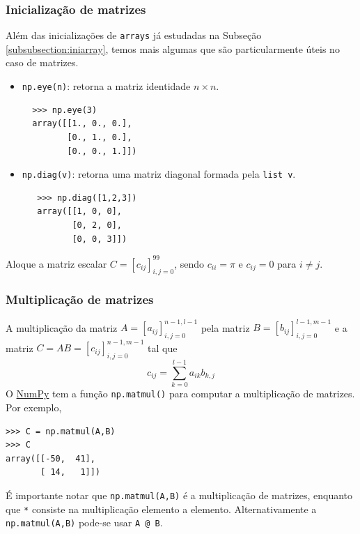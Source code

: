 \documentclass[12pt]{article}
\begin{document}
\subsubsection{Inicialização de matrizes}

Além das inicializações de \lstinline+arrays+ já estudadas na Subseção \ref{subsubsection:iniarray}, temos mais algumas que são particularmente úteis no caso de matrizes.
\begin{itemize}
\item \lstinline+np.eye(n)+: retorna a matriz identidade $n\times n$.
  \begin{lstlisting}
  >>> np.eye(3)
  array([[1., 0., 0.],
         [0., 1., 0.],
         [0., 0., 1.]])
   \end{lstlisting}
 \item \lstinline+np.diag(v)+: retorna uma matriz diagonal formada pela \lstinline+list v+.
   \begin{lstlisting}
   >>> np.diag([1,2,3])
   array([[1, 0, 0],
          [0, 2, 0],
          [0, 0, 3]])
   \end{lstlisting}
 \end{itemize}

 \begin{exr}
   Aloque a matriz escalar $C = [c_{ij}]_{i,j=0}^{99}$, sendo $c_{ii}=\pi$ e $c_{ij}=0$ para $i\neq j$.
 \end{exr}

\subsubsection{Multiplicação de matrizes}

A multiplicação da matriz $A = [a_{ij}]_{i,j=0}^{n-1,l-1}$ pela matriz $B = [b_{ij}]_{i,j=0}^{l-1,m-1}$ e a matriz $C = AB = [c_{ij}]_{i,j=0}^{n-1,m-1}$ tal que
\begin{equation}
  c_{ij} = \sum_{k=0}^{l-1} a_{ik}b_{k,j}
\end{equation}
O \href{https://numpy.org/}{NumPy} tem a função \lstinline+np.matmul()+ para computar a multiplicação de matrizes. Por exemplo,
\begin{lstlisting}
>>> C = np.matmul(A,B)
>>> C
array([[-50,  41],
       [ 14,   1]])
\end{lstlisting}

\begin{obs}
  É importante notar que \lstinline+np.matmul(A,B)+ é a multiplicação de matrizes, enquanto que \lstinline+*+ consiste na multiplicação elemento a elemento. Alternativamente a \lstinline+np.matmul(A,B)+ pode-se usar \lstinline+A @ B+.
\end{obs}
\end{document}
